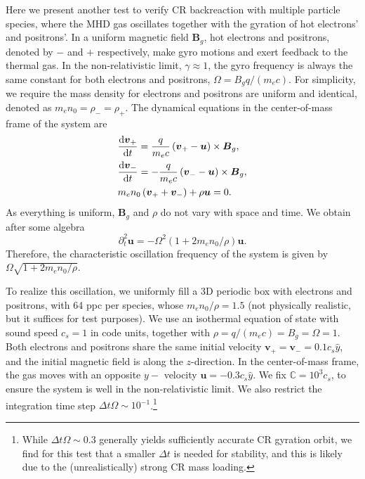 \documentclass[fleqn,usenatbib]{mnras}
\begin{document}
Here we present
another test to verify CR backreaction with multiple particle species, where the MHD gas oscillates together with the gyration of hot electrons' and positrons'. In a uniform magnetic field $\boldsymbol{B}_g$, hot electrons and positrons, denoted by $-$ and $+$ respectively, make gyro motions and exert feedback to the thermal gas. In the non-relativistic limit, $\gamma\approx 1$, the gyro frequency is always the same constant for both electrons and positrons, $\Omega=B_g q / \left(m_ec\right)$. For simplicity, we require the mass density for electrons and positrons are uniform and identical, denoted as $m_e n_0=\rho_-=\rho_+$. The dynamical equations in the center-of-mass frame of the system are
\begin{align}
	&\frac{\dd \boldsymbol{v}_+}{\dd t} = \frac{q}{m_ec} \left(\boldsymbol{v}_+ - \boldsymbol{u}\right)\times \boldsymbol{B}_g, \notag \\
	&\frac{\dd \boldsymbol{v}_-}{\dd t} = -\frac{q}{m_ec} \left(\boldsymbol{v}_- - \boldsymbol{u}\right)\times \boldsymbol{B}_g, \notag \\
	&m_e n_0 \left(\boldsymbol{v}_+ + \boldsymbol{v}_-\right) + \rho \boldsymbol{u} = 0. \label{equ::rel_vel}
\end{align}
As everything is uniform, $\boldsymbol{B}_g$ and $\rho$ do not vary with space and time. We obtain after some algebra
\begin{equation}
	\partial_t^2 \boldsymbol{u} = -\Omega^2 \left(1 + 2m_e n_0 / \rho\right) \boldsymbol{u}.
    \label{equ::rel_vel_gas_osc}
\end{equation}
Therefore, the characteristic oscillation frequency of the system is given by
$\Omega \sqrt{1 + 2m_e n_0 / \rho}$.

To realize this oscillation,  we uniformly fill a 3D periodic box with electrons and positrons, with 64 ppc per species, whose $m_e n_0 / \rho = 1.5$ (not physically realistic, but it suffices for test purposes). We use an isothermal equation of state with sound speed $c_s = 1$ in code units, together with $\rho=q / \left(m_ec\right) = B_g =\Omega = 1$. Both electrons and positrons share the same initial velocity $\boldsymbol{v}_+ = \boldsymbol{v}_-=0.1 c_s \hat{y}$, and the initial magnetic field is along the $z$-direction. In the center-of-mass frame,
the gas moves
with an opposite $y-$ velocity $\boldsymbol{u}=-0.3 c_s\hat{y}$.
We fix $\mathbb{C} = 10^3 c_s$, to ensure the system is well in the non-relativistic limit. We also restrict the integration time step $\Delta t \Omega \sim 10^{-1}$.\footnote{While $\Delta t \Omega \sim 0.3$ generally yields sufficiently accurate CR gyration orbit, we find for this test that a smaller $\Delta t$ is needed for stability, and this is likely due to the (unrealistically) strong CR mass loading.}
\end{document}
